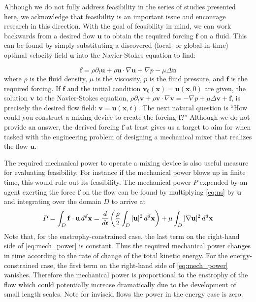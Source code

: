Although we do not fully address feasibility in the series of studies presented here, we acknowledge that feasibility is an important issue and encourage research in this direction. With the goal of feasibility in mind, we can work backwards from a desired flow $\mathbf{u}$ to obtain the required forcing $\mathbf{f}$ on a fluid. This can be found by simply substituting a discovered (local- or global-in-time) optimal velocity field $\mathbf{u}$ into the Navier-Stokes equation to find:

\begin{equation}
\label{eq:ns}
\mathbf{f} = \rho\partial_{t} \mathbf{u}  + \rho\mathbf{u}\cdot \nabla \mathbf{u} + \nabla p - \mu \Delta \mathbf{u} 
\end{equation}
where $\rho$ is the fluid density, $\mu$ is the viscosity, $p$ is the fluid pressure, and $\mathbf{f}$ is the required forcing. If $\mathbf{f}$ and the initial condition $\mathbf{v}_0(\mathbf{x})=\mathbf{u}(\mathbf{x},0)$ are given, the solution $\mathbf{v}$ to the Navier-Stokes equation, $\rho\partial_{t} \mathbf{v}  + \rho\mathbf{v}\cdot \nabla \mathbf{v} = - \nabla p + \mu \Delta \mathbf{v} +\mathbf{f}$, is precisely the desired flow field: $\mathbf{v} = \mathbf{u}(\mathbf{x},t)$. The next natural question is ``How could you construct a mixing device to create the forcing $\mathbf{f}$?'' Although we do not provide an answer, the derived forcing $\mathbf{f}$ at least gives us a target to aim for when tasked with the engineering problem of designing a mechanical mixer that realizes the flow $\mathbf{u}$. 


The required mechanical power to operate a mixing device is also useful measure for evaluating feasibility. For instance if the mechanical power blows up in finite time, this would rule out its feasibility. The mechanical power $P$ expended by an agent exerting the force $\mathbf{f}$ on the flow can be found by multiplying \eqref{eq:ns} by $\mathbf{u}$ and integrating over the domain $D$ to arrive at
 \begin{equation}
 \label{eq:mech_power}
P = \int_{D} \mathbf{f}\cdot\mathbf{u} \, d^{d}\mathbf{x} = \frac{d }{dt}\left( \frac{\rho}{2}\int_{D} |\mathbf{u}|^2 \, d^{d}\mathbf{x}\right) + \mu\int_{D} |\nabla\mathbf{u}|^2 \, d^{d}\mathbf{x}
\end{equation}
Note that, for the enstrophy-constrained case, the last term on the right-hand side of \eqref{eq:mech_power} is constant. Thus the required mechanical power changes in time according to the rate of change of the total kinetic energy. For the energy-constrained case, the first term on the right-hand side of \eqref{eq:mech_power} vanishes. Therefore the mechanical power is proportional to the enstrophy of the flow which could potentially increase dramatically due to the development of small length scales. Note for inviscid flows the power in the energy case is zero.



